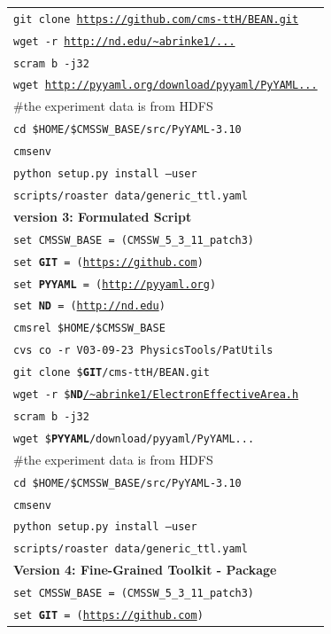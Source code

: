 \documentclass{acm_proc_article-sp}
\begin{document}
\begin{table}
\begin{tabular}{|l|}
        {\tt git clone \url{https://github.com/cms-ttH/BEAN.git}} \\
        {\tt wget -r \url{http://nd.edu/~abrinke1/...}} \\
        {\tt scram b -j32} \\
        {\tt wget \url{http://pyyaml.org/download/pyyaml/PyYAML...}}\\
        \#the experiment data is from HDFS \\
        {\tt cd \$HOME/\$CMSSW\_BASE/src/PyYAML-3.10}\\
        {\tt cmsenv}\\
        {\tt python setup.py install --user} \\
        {\tt scripts/roaster data/generic\_ttl.yaml} \\ 
        \hline
        {\bf version 3: Formulated Script} \\ \hline
        {\tt set CMSSW\_BASE = (CMSSW\_5\_3\_11\_patch3)} \\
        {\tt set {\bf GIT} = (\url{https://github.com})} \\
        {\tt set {\bf PYYAML} = (\url{http://pyyaml.org})} \\
        {\tt set {\bf ND} = (\url{http://nd.edu})} \\
        {\tt cmsrel \$HOME/\$CMSSW\_BASE} \\
        {\tt cvs co -r V03-09-23 PhysicsTools/PatUtils} \\
        {\tt git clone \${\bf GIT}/cms-ttH/BEAN.git} \\
        {\tt wget -r \${\bf ND}\url{/~abrinke1/ElectronEffectiveArea.h}} \\
        {\tt scram b -j32} \\
        {\tt wget \${\bf PYYAML}/download/pyyaml/PyYAML...}\\
        \#the experiment data is from HDFS \\
        {\tt cd \$HOME/\$CMSSW\_BASE/src/PyYAML-3.10}\\
        {\tt cmsenv}\\
        {\tt python setup.py install --user} \\
        {\tt scripts/roaster data/generic\_ttl.yaml} \\ 
        \hline
       {\bf Version 4: Fine-Grained Toolkit - Package}\\ \hline
        {\tt set CMSSW\_BASE = (CMSSW\_5\_3\_11\_patch3)} \\
        {\tt set {\bf GIT} = (\url{https://github.com})} \\

\end{tabular}
\end{table}
\end{document}

